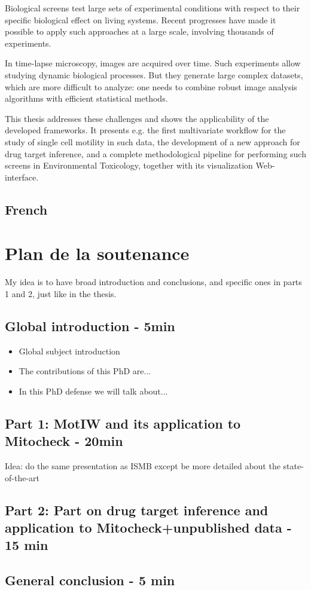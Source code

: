 \documentclass[12pt]{article}
\begin{document}
Biological screens test large sets of experimental conditions with
respect to their specific biological effect on living systems. Recent
progresses have made it possible to apply such approaches at a large
scale, involving thousands of experiments. 

In time-lapse microscopy, images are acquired over time. Such
experiments allow studying dynamic biological processes. But they
generate large complex datasets, which are more difficult to analyze:
one needs to combine robust image analysis algorithms with efficient
statistical methods.  

This thesis addresses these challenges and shows the applicability of
the developed frameworks. It presents e.g. the first multivariate
workflow for the study of single cell motility in such data, the
development of a new approach for drug target inference, and a
complete methodological pipeline for performing such screens in
Environmental Toxicology, together with its visualization
Web-interface. 

\subsection{French}

\section{Plan de la soutenance}
My idea is to have broad introduction and conclusions, and specific ones in parts 1 and 2, just like in the thesis.
\subsection*{Global introduction - 5min}
\begin{itemize}
\item Global subject introduction
\item The contributions of this PhD are... 
\item In this PhD defense we will talk about...
\end{itemize}
\subsection*{Part 1: MotIW and its application to Mitocheck - 20min}
Idea: do the same presentation as ISMB except be more detailed about the state-of-the-art
\subsection*{Part 2: Part on drug target inference and application to Mitocheck+unpublished data - 15 min}
\subsection*{General conclusion - 5 min}

%
%
\end{document}
